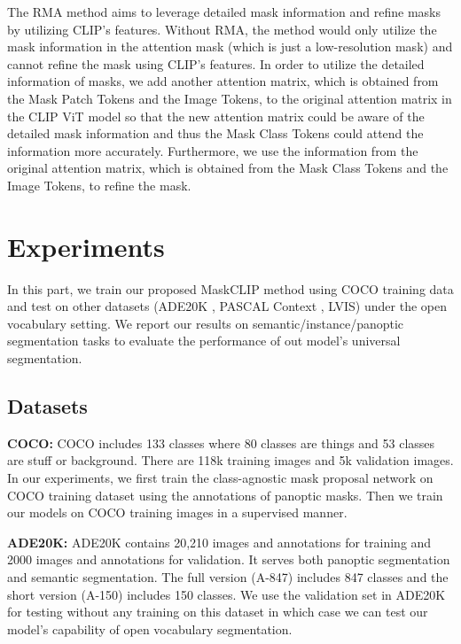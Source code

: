 \documentclass{article}
\theoremstyle{plain}
\theoremstyle{definition}
\theoremstyle{remark}
\begin{document}
The RMA method aims to leverage detailed mask information and refine masks by utilizing CLIP's features. Without RMA, the method would only utilize the mask information in the attention mask (which is just a low-resolution mask) and cannot refine the mask using CLIP's features. In order to utilize the detailed information of masks, we add another attention matrix, which is obtained from the Mask Patch Tokens and the Image Tokens, to the original attention matrix in the CLIP ViT model so that the new attention matrix could be aware of the detailed mask information and thus the Mask Class Tokens could attend the information more accurately. Furthermore, we use the information from the original attention matrix, which is obtained from the Mask Class Tokens and the Image Tokens, to refine the mask.






\section{Experiments}

In this part, we train our proposed MaskCLIP method using COCO  \citep{lin2014microsoft} training data and test on other datasets (ADE20K  \citep{zhou2016semantic, zhou2017scene}, PASCAL Context  \citep{mottaghi_cvpr14}, LVIS) under the open vocabulary setting. We report our results on semantic/instance/panoptic segmentation tasks to evaluate the performance of out model's universal segmentation.
\subsection{Datasets}

\textbf{COCO:} COCO \citep{lin2014microsoft} includes 133 classes where 80 classes are things and 53 classes are stuff or background. There are 118k training images and 5k validation images. In our experiments, we first train the class-agnostic mask proposal network on COCO training dataset using the annotations of panoptic masks. Then we train our models on COCO training images in a supervised manner.

\textbf{ADE20K:} ADE20K  \citep{zhou2016semantic, zhou2017scene} contains 20,210 images and annotations for training and 2000 images and annotations for validation. It serves both panoptic segmentation and semantic segmentation. The full version (A-847)  \citep{zhou2016semantic} includes 847 classes and the short version (A-150)  \citep{zhou2017scene} includes 150 classes. We use the validation set in ADE20K for testing without any training on this dataset in which case we can test our model's capability of open vocabulary segmentation. 
\end{document}
